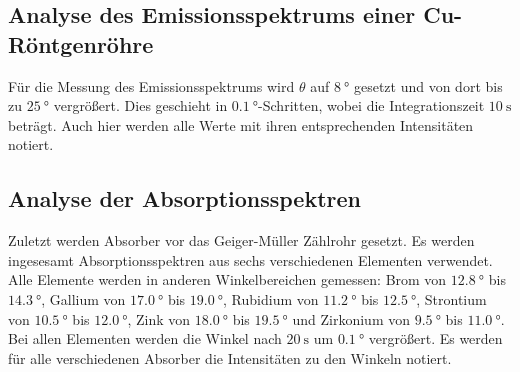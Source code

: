\subsection{Analyse des Emissionsspektrums einer Cu-Röntgenröhre}
\label{ssec:kupfer}

Für die Messung des Emissionsspektrums wird $\theta$ auf $\SI{8}{\degree}$ gesetzt und von dort bis zu $\SI{25}{\degree}$ vergrößert.
Dies geschieht in $\SI{0.1}{\degree}$-Schritten, wobei die Integrationszeit $\SI{10}{\second}$ beträgt.
Auch hier werden alle Werte mit ihren entsprechenden Intensitäten notiert.

\subsection{Analyse der Absorptionsspektren}
\label{ssec:spektrum}

Zuletzt werden Absorber vor das Geiger-Müller Zählrohr gesetzt.
Es werden ingesesamt Absorptionsspektren aus sechs verschiedenen Elementen verwendet.
Alle Elemente werden in anderen Winkelbereichen gemessen:
Brom von $\SI{12.8}{\degree}$ bis $\SI{14.3}{\degree}$, Gallium von $\SI{17.0}{\degree}$ bis $\SI{19.0}{\degree}$, Rubidium von $\SI{11.2}{\degree}$ bis $\SI{12.5}{\degree}$, Strontium von $\SI{10.5}{\degree}$ bis $\SI{12.0}{\degree}$, Zink von $\SI{18.0}{\degree}$ bis $\SI{19.5}{\degree}$ und Zirkonium von $\SI{9.5}{\degree}$ bis $\SI{11.0}{\degree}$.
Bei allen Elementen werden die Winkel nach $\SI{20}{\second}$ um $\SI{0.1}{\degree}$ vergrößert.
Es werden für alle verschiedenen Absorber die Intensitäten zu den Winkeln notiert.